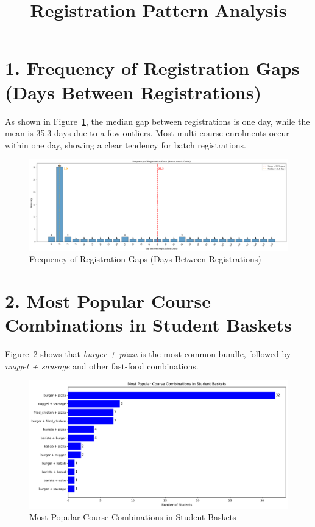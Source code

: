 \documentclass[12pt,a4paper]{article}
\title{Registration Pattern Analysis}
\date{}
\begin{document}
\maketitle

\section*{1. Frequency of Registration Gaps (Days Between Registrations)}
As shown in Figure~\ref{fig:reg-gap}, the median gap between registrations is one day, while the mean is 35.3 days due to a few outliers. Most multi-course enrolments occur within one day, showing a clear tendency for batch registrations.

\begin{figure}[h!]
    \centering
    \includegraphics[width=1\textwidth]{Frequency of Registration Gaps (Days between registrations).png}
    \caption{Frequency of Registration Gaps (Days Between Registrations)}
    \label{fig:reg-gap}
\end{figure}

\section*{2. Most Popular Course Combinations in Student Baskets}
Figure~\ref{fig:combo-basket} shows that \textit{burger + pizza} is the most common bundle, followed by \textit{nugget + sausage} and other fast-food combinations.

\begin{figure}[h!]
    \centering
    \includegraphics[width=1\textwidth]{Most Popular Course Combinations in Student Baskets.png}
    \caption{Most Popular Course Combinations in Student Baskets}
    \label{fig:combo-basket}
\end{figure}
\end{document}
